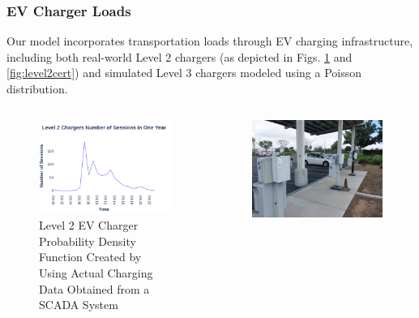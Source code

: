 \documentclass[aspectratio=169, 8 pt]{beamer}
\begin{document}
	\begin{frame}
		\frametitle{EV Charger Loads}
		Our model incorporates transportation loads through EV charging infrastructure, including both real-world Level 2 chargers (as depicted in Figs. \ref{fig:l2avgdayrandpoisson1hourpdf} and \ref{fig:level2cert}) and simulated Level 3 chargers modeled using a Poisson distribution.
		\begin{columns}
			\begin{column}{0.5\linewidth}
				\begin{block}{}
					\begin{figure}
						\centering
						\includegraphics[width=0.9\linewidth]{Fig/Option_3/l2_avg_day_rand_poisson_1_hour_real.pdf}
						\caption{\footnotesize Level 2 EV Charger Probability Density Function  Created  by Using Actual Charging Data Obtained from a SCADA System}
						\label{fig:l2avgdayrandpoisson1hourpdf}
					\end{figure}
				\end{block}
			\end{column}
			\begin{column}{0.5\linewidth}
				\begin{block}{}
					\begin{figure}
						\centering
						\includegraphics[width=0.9\linewidth]{Fig/Option_3/level_2_cert}

\end{figure}
\end{block}
\end{column}
\end{columns}
\end{frame}
\end{document}
